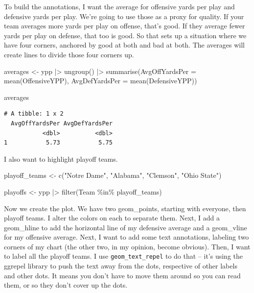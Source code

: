 \documentclass[
  letterpaper,
  DIV=11,
  numbers=noendperiod]{scrreprt}
\newenvironment{Shaded}{\begin{snugshade}}{\end{snugshade}}
\newcommand{\AttributeTok}[1]{\textcolor[rgb]{0.40,0.45,0.13}{#1}}
\newcommand{\FunctionTok}[1]{\textcolor[rgb]{0.28,0.35,0.67}{#1}}
\newcommand{\NormalTok}[1]{\textcolor[rgb]{0.00,0.23,0.31}{#1}}
\newcommand{\OtherTok}[1]{\textcolor[rgb]{0.00,0.23,0.31}{#1}}
\newcommand{\SpecialCharTok}[1]{\textcolor[rgb]{0.37,0.37,0.37}{#1}}
\newcommand{\StringTok}[1]{\textcolor[rgb]{0.13,0.47,0.30}{#1}}
\begin{document}
To build the annotations, I want the average for offensive yards per
play and defensive yards per play. We're going to use those as a proxy
for quality. If your team averages more yards per play on offense,
that's good. If they average fewer yards per play on defense, that too
is good. So that sets up a situation where we have four corners,
anchored by good at both and bad at both. The averages will create lines
to divide those four corners up.

\begin{Shaded}
\begin{Highlighting}[]
\NormalTok{averages }\OtherTok{\textless{}{-}}\NormalTok{ ypp }\SpecialCharTok{|\textgreater{}} \FunctionTok{ungroup}\NormalTok{() }\SpecialCharTok{|\textgreater{}} \FunctionTok{summarise}\NormalTok{(}\AttributeTok{AvgOffYardsPer =} \FunctionTok{mean}\NormalTok{(OffensiveYPP), }\AttributeTok{AvgDefYardsPer =} \FunctionTok{mean}\NormalTok{(DefensiveYPP))}

\NormalTok{averages}
\end{Highlighting}
\end{Shaded}

\begin{verbatim}
# A tibble: 1 x 2
  AvgOffYardsPer AvgDefYardsPer
           <dbl>          <dbl>
1           5.73           5.75
\end{verbatim}

I also want to highlight playoff teams.

\begin{Shaded}
\begin{Highlighting}[]
\NormalTok{playoff\_teams }\OtherTok{\textless{}{-}} \FunctionTok{c}\NormalTok{(}\StringTok{"Notre Dame"}\NormalTok{, }\StringTok{"Alabama"}\NormalTok{, }\StringTok{"Clemson"}\NormalTok{, }\StringTok{"Ohio State"}\NormalTok{)}

\NormalTok{playoffs }\OtherTok{\textless{}{-}}\NormalTok{ ypp }\SpecialCharTok{|\textgreater{}} \FunctionTok{filter}\NormalTok{(Team }\SpecialCharTok{\%in\%}\NormalTok{ playoff\_teams)}
\end{Highlighting}
\end{Shaded}

Now we create the plot. We have two geom\_points, starting with
everyone, then playoff teams. I alter the colors on each to separate
them. Next, I add a geom\_hline to add the horizontal line of my
defensive average and a geom\_vline for my offensive average. Next, I
want to add some text annotations, labeling two corners of my chart (the
other two, in my opinion, become obvious). Then, I want to label all the
playoff teams. I use \texttt{geom\_text\_repel} to do that -- it's using
the ggrepel library to push the text away from the dots, respective of
other labels and other dots. It means you don't have to move them around
so you can read them, or so they don't cover up the dots.
\end{document}
